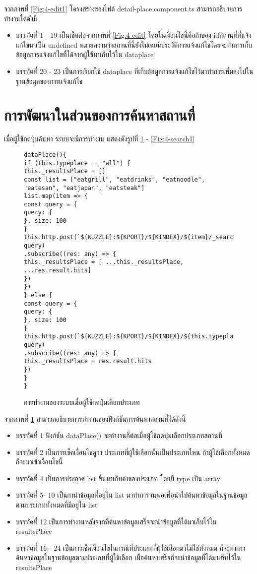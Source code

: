 จากภาพที่ \ref{Fig:4-edit1} โครงสร้างของไฟล์ detail-place.component.ts สามารถอธิบายการทำงานได้ดังนี้
\begin{itemize}[label={--}]
\item บรรทัดที่ 1 - 19 เป็นเช็คต่อจากภาพที่ \ref{Fig:4-edit} โดยในเงื่อนไขนี้คือถ้าของ idสถานที่ที่แจ้งแก้ไขมาเป็น undefined หมายความว่าสถานที่นี้ยังไม่เคยมีประวัติการแจ้งแก้ไขโดยจะทำการเก็บข้อมูลการแจ้งแก้ไขที่ได้จากผู้ใช้มาเก็บไว้ใน dataplace
\item บรรทัดที่ 20 - 23 เป็นการเรียกใช้ dataplace ที่เก็บข้อมูลการแจ้งแก้ไขไว้มาทำการเพิ่มลงไปในฐานข้อมูลของการแจ้งแก้ไข 
\end{itemize}
\newpage

\section{การพัฒนาในส่วนของการค้นหาสถานที่}
เมื่อผู้ใช้กดปุ่มค้นหา ระบบจะมีการทำงาน แสดงดังรูปที่ \ref{Fig:4-search} - \ref{Fig:4-search1}
\begin{figure}[H]
{\begin{lstlisting}
dataPlace(){
if (this.typeplace == "all") {
this._resultsPlace = []
const list = ["eatgrill", "eatdrinks", "eatnoodle", "eatesan", "eatjapan", "eatsteak"]
list.map(item => {
const query = {
query: {
}, size: 100
}
this.http.post(`${KUZZLE}:${KPORT}/${KINDEX}/${item}/_search`, query)
.subscribe((res: any) => {
this._resultsPlace = [ ...this._resultsPlace,
...res.result.hits]
})
})
} else {
const query = {
query: {
}, size: 100
}
this.http.post(`${KUZZLE}:${KPORT}/${KINDEX}/${this.typeplace}/_search`, query)
.subscribe((res: any) => {
this._resultsPlace = res.result.hits
})
}
}
\end{lstlisting}}
\caption{การทำงานของระบบเมื่อผู้ใช้กดปุ่มเลือกประเภท}
\label{Fig:4-search}
\end{figure}

จากภาพที่ \ref{Fig:4-search} สามารถอธิบายการทำงานของฟังก์ชันการค้นหาสถานที่ได้ดังนี้
\begin{itemize}[label={--}]
\item บรรทัดที่ 1 ฟังก์ชัน dataPlace() จะทำงานก็ต่อเมื่อผู้ใช้กดปุ่มเลือกประเภทสถานที่
\item บรรทัดที่ 2 เป็นการเช็คเงื่อนไขดูว่า ประเภทที่ผู้ใช้เลือกนั้นเป็นประเภทไหน ถ้าผู้ใช้เลือกทั้งหมด ก็จะมาเข้าเงื่อนไขนี้
\item บรรทัดที่ 4 เป็นการประกาศ list ขึ้นมาเก็บค่าของประเภท โดยมี type เป็น array
\item บรรทัดที่ 5- 10 เป็นกานำข้อมูลที่อยู่ใน list มาทำการวนฟอเพื่อนำไปค้นหาข้อมูลในฐานข้อมูลตามประเภททั้งหมดที่มีอยู่ใน list
\item บรรทัดที่ 12 เป็นการทำงานหลังจากที่ค้นหาข้อมูลเสร็จจะนำข้อมูลที่ได้มาเก็บไว้ใน resultsPlace
\item บรรทัดที่ 16 - 24 เป็นการเช็คเงื่อนไขในกรณีที่ประเภทที่ผู้ใช้เลือกมาไม่ใช่ทั้งหมด ก็จะทำการค้นหาข้อมูลในฐานข้อมูลตามประเภทที่ผู้ใช้เลือก เมื่อค้นหาเสร็จก็จะนำข้อมูลที่ได้มาเก็บไว้ใน resultsPlace 
\end{itemize}


